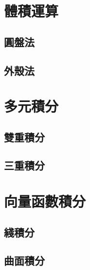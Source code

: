 \documentclass[12pt]{article}
\begin{document}
    \section*{體積運算}
    \subsection*{圓盤法}
    \subsection*{外殼法}
    \section*{多元積分}
    \subsection*{雙重積分}
    \subsection*{三重積分}
    \section*{向量函數積分}
    \subsection*{綫積分}
    \subsection*{曲面積分}
\end{document}
